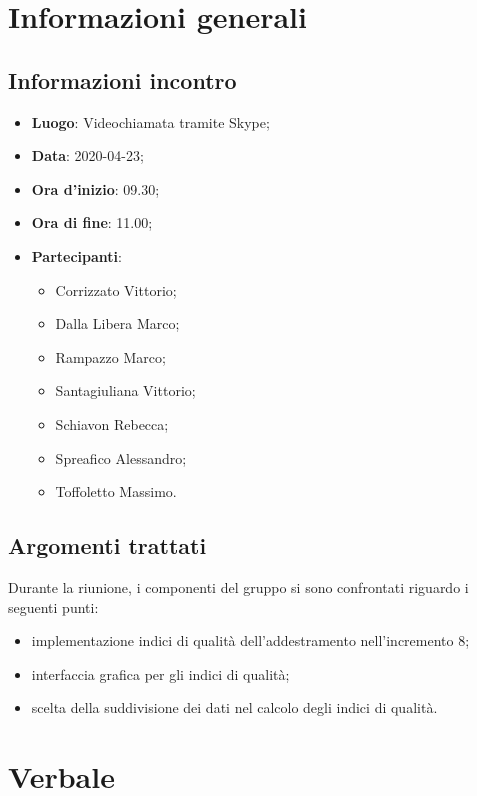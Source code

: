 \section{Informazioni generali}
    \subsection{Informazioni incontro}
        \begin{itemize}
            \item \textbf{Luogo}: Videochiamata tramite Skype;
            \item \textbf{Data}: 2020-04-23;
            \item \textbf{Ora d'inizio}: 09.30;
            \item \textbf{Ora di fine}: 11.00;
            \item \textbf{Partecipanti}: 
            \begin{itemize}
                \item Corrizzato Vittorio;
                \item Dalla Libera Marco;
                \item Rampazzo Marco;
                \item Santagiuliana Vittorio;
                \item Schiavon Rebecca;
                \item Spreafico Alessandro;
                \item Toffoletto Massimo.
            \end{itemize}
        \end{itemize}
    \subsection{Argomenti trattati}
    Durante la riunione, i componenti del gruppo si sono confrontati riguardo i seguenti punti:
    \begin{itemize}
    	\item implementazione indici di qualità dell'addestramento nell'incremento 8;
    	\item interfaccia grafica per gli indici di qualità;
    	\item scelta della suddivisione dei dati nel calcolo degli indici di qualità.
    \end{itemize}
    
\section{Verbale}
